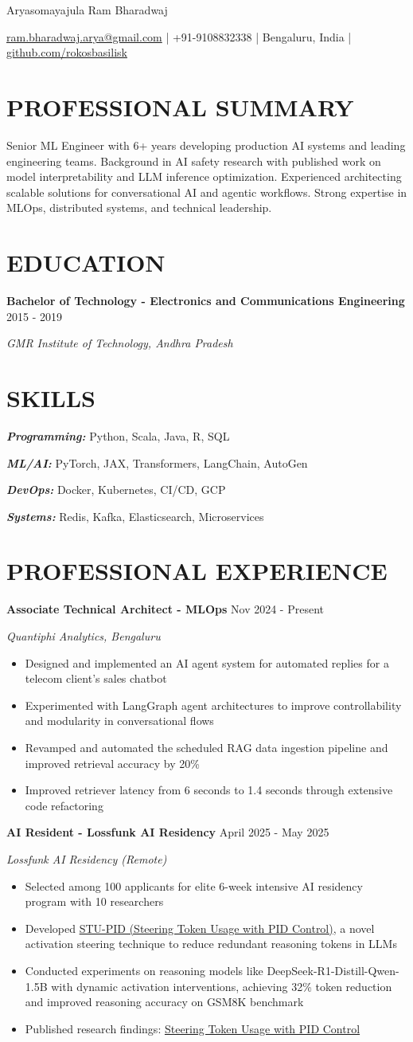 \documentclass[fontsize=11pt]{article}
\newcommand{\MyName}[1]{
    \Huge \usefont{OT1}{phv}{b}{n} \hfill #1
    \par \normalsize \normalfont}
\newcommand{\NewPart}[1]{\section*{\uppercase{#1}}}
\newcommand{\SkillsEntry}[2]{
    \noindent\textbf{\textit{#1}} \hspace{1.5em} #2 \par}
\newcommand{\EducationEntry}[4]{
    \noindent \textbf{#1} \hfill {#2} \par
    \noindent \textit{#3} \par
    \noindent \small #4
    \normalsize \par}
\newcommand{\WorkEntry}[4]{
    \noindent \textbf{#1} \hfill {#2} \par
    \noindent \textit{#3} \par
    \noindent \small #4
    \normalsize \par}
\newcommand{\AboutEntry}[1]{
    \noindent #1 \par}
\begin{document}
\MyName{Aryasomayajula Ram Bharadwaj}
\bigskip

{\small \hfill \href{mailto:ram.bharadwaj.arya@gmail.com}{ram.bharadwaj.arya@gmail.com} | +91-9108832338 | Bengaluru, India | \href{https://github.com/rokosbasilisk}{github.com/rokosbasilisk}}

\NewPart{PROFESSIONAL SUMMARY}
\AboutEntry{Senior ML Engineer with 6+ years developing production AI systems and leading engineering teams. Background in AI safety research with published work on model interpretability and LLM inference optimization. Experienced architecting scalable solutions for conversational AI and agentic workflows. Strong expertise in MLOps, distributed systems, and technical leadership.}

\NewPart{EDUCATION}
\EducationEntry
{Bachelor of Technology - Electronics and Communications Engineering}
{2015 - 2019}
{GMR Institute of Technology, Andhra Pradesh}
{}

\NewPart{SKILLS}
\SkillsEntry{Programming:}{Python, Scala, Java, R, SQL}
\SkillsEntry{ML/AI:}{PyTorch, JAX, Transformers, LangChain, AutoGen}
\SkillsEntry{DevOps:}{Docker, Kubernetes, CI/CD, GCP}
\SkillsEntry{Systems:}{Redis, Kafka, Elasticsearch, Microservices}

\NewPart{PROFESSIONAL EXPERIENCE}
\WorkEntry
{Associate Technical Architect - MLOps}
{Nov 2024 - Present}
{Quantiphi Analytics, Bengaluru}
{%
\begin{itemize}
\item Designed and implemented an AI agent system for automated replies for a telecom client's sales chatbot
\item Experimented with LangGraph agent architectures to improve controllability and modularity in conversational flows
\item Revamped and automated the scheduled RAG data ingestion pipeline and improved retrieval accuracy by 20\%
\item Improved retriever latency from 6 seconds to 1.4 seconds through extensive code refactoring
\end{itemize}}

\WorkEntry
{AI Resident - Lossfunk AI Residency}
{April 2025 - May 2025}
{Lossfunk AI Residency (Remote)}
{%
\begin{itemize}
\item Selected among 100 applicants for elite 6-week intensive AI residency program with 10 researchers
\item Developed \href{https://github.com/rokosbasilisk/STU-PID}{STU-PID (Steering Token Usage with PID Control)}, a novel activation steering technique to reduce redundant reasoning tokens in LLMs
\item Conducted experiments on reasoning models like DeepSeek-R1-Distill-Qwen-1.5B with dynamic activation interventions, achieving 32\% token reduction and improved reasoning accuracy on GSM8K benchmark
\item Published research findings: \href{https://arxiv.org/abs/2506.18831}{Steering Token Usage with PID Control}
\end{itemize}}
\end{document}
